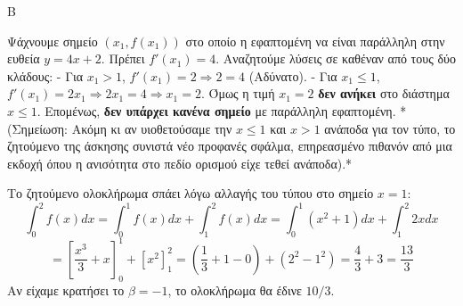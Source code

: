 \begin{thema}{Β}
\begin{erwthma}
\item Ψάχνουμε σημείο $(x_1, f(x_1))$ στο οποίο η εφαπτομένη να είναι παράλληλη στην ευθεία $y = 4x+2$. 
Πρέπει $f'(x_1) = 4$.
Αναζητούμε λύσεις σε καθέναν από τους δύο κλάδους:
- Για $x_1 > 1$, $f'(x_1) = 2 \Rightarrow 2 = 4$ (Αδύνατο).
- Για $x_1 \le 1$, $f'(x_1) = 2x_1 \Rightarrow 2x_1 = 4 \Rightarrow x_1 = 2$.
Όμως η τιμή $x_1=2$ \textbf{δεν ανήκει} στο διάστημα $x \le 1$.
Επομένως, \textbf{δεν υπάρχει κανένα σημείο} με παράλληλη εφαπτομένη. 
*(Σημείωση: Ακόμη κι αν υιοθετούσαμε την $x \le 1$ και $x>1$ ανάποδα για τον τύπο, το ζητούμενο της άσκησης συνιστά νέο προφανές σφάλμα, επηρεασμένο πιθανόν από μια εκδοχή όπου η ανισότητα στο πεδίο ορισμού είχε τεθεί ανάποδα).*

\item Το ζητούμενο ολοκλήρωμα σπάει λόγω αλλαγής του τύπου στο σημείο $x=1$:
\[ \int_0^2 f(x) dx = \int_0^1 f(x) dx + \int_1^2 f(x) dx = \int_0^1 (x^2+1) dx + \int_1^2 2x dx \]
\[ = \left[ \frac{x^3}{3} + x \right]_0^1 + \left[ x^2 \right]_1^2 = \left( \frac{1}{3} + 1 - 0 \right) + (2^2 - 1^2) = \frac{4}{3} + 3 = \frac{13}{3} \]
Αν είχαμε κρατήσει το $\beta=-1$, το ολοκλήρωμα θα έδινε $10/3$.
\end{erwthma}
\end{thema}

